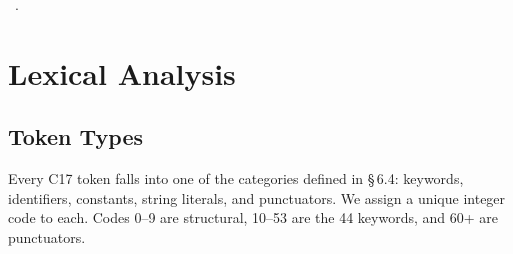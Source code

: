 \documentclass[11pt,a4paper,twoside,openright,DIV=15]{scrbook}
\theoremstyle{definition}
\theoremstyle{plain}
\theoremstyle{remark}
\newcommand{\stdref}[1]{\S\,#1}
\begin{document}
\begin{flushleft}
\begin{minipage}{\linewidth}
\vspace{-1.5ex}
\footnotesize
\begin{list}{}{\setlength{\itemsep}{-\parsep}\setlength{\itemindent}{-\leftmargin}}
\item \NWtxtMacroRefIn\ .

\item{}
\end{list}
\end{minipage}\vspace{4ex}
\end{flushleft}
%
%
%

\chapter{Lexical Analysis}
\label{ch:lexer}

\section{Token Types}

Every C17 token falls into one of the categories defined in \stdref{6.4}:
keywords, identifiers, constants, string literals, and punctuators.
We assign a unique integer code to each.  Codes 0--9 are structural,
10--53 are the 44 keywords, and 60+ are punctuators.
\end{document}
